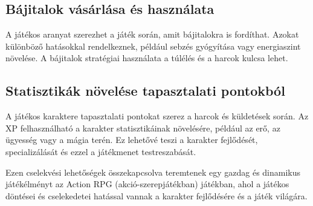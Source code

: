 \subsection{Bájitalok vásárlása és használata}

\indent \indent A játékos aranyat szerezhet a játék során, amit bájitalokra is fordíthat. Azokat különböző hatásokkal rendelkeznek, például sebzés gyógyítása vagy energiaszint növelése. A bájitalok stratégiai használata a túlélés és a harcok kulcsa lehet.

\subsection{Statisztikák növelése tapasztalati pontokból}

\indent \indent A játékos karaktere tapasztalati pontokat szerez a harcok és küldetések során. Az XP felhasználható a karakter statisztikáinak növelésére, például az erő, az ügyesség vagy a mágia terén. Ez lehetővé teszi a karakter fejlődését, specializálását és ezzel a játékmenet testreszabását.

Ezen cselekvési lehetőségek összekapcsolva teremtenek egy gazdag és dinamikus játékélményt az Action RPG (akció-szerepjátékban) játékban, ahol a játékos döntései és cselekedetei hatással vannak a karakter fejlődésére és a játék világára.



